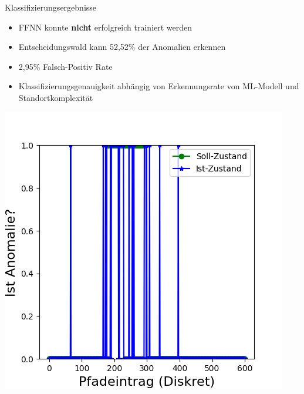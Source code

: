 \documentclass[10pt]{beamer}
\begin{document}
\begin{frame}{Klassifizierungsergebnisse}
    \begin{minipage}{.5\textwidth}
        \begin{itemize}
            \item FFNN konnte \textbf{nicht} erfolgreich trainiert werden
            \item Entscheidungswald kann 52,52\% der Anomalien erkennen
            \item 2,95\% Falsch-Positiv Rate
            \item Klassifizierungsgenauigkeit abhängig von Erkennungsrate von ML-Modell und Standortkomplexität
        \end{itemize}
    \end{minipage}%
    \begin{minipage}{.5\textwidth}
        \centering
        \includegraphics[width=\linewidth]{anomaly_detection/soll_vs_ist_anomaly.png} 
    \end{minipage}
\end{frame}
\end{document}
